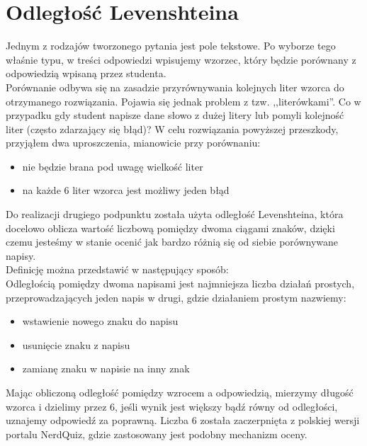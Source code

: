 \documentclass[a4paper,12pt]{article}
\begin{document}
\section{Odległość Levenshteina}
Jednym z rodzajów tworzonego pytania jest pole tekstowe. Po wyborze tego właśnie typu, w
treści odpowiedzi wpisujemy wzorzec, który będzie porównany z odpowiedzią wpisaną przez
studenta.\\
Porównanie odbywa się na zasadzie przyrównywania kolejnych liter wzorca do otrzymanego
rozwiązania. Pojawia się jednak problem z tzw. ,,literówkami''. Co w przypadku gdy student
napisze dane słowo z dużej litery lub pomyli kolejność liter (często zdarzający się błąd)?
W celu rozwiązania powyższej przeszkody, przyjąłem dwa uproszczenia, mianowicie przy
porównaniu:
\begin{itemize}
  \item nie będzie brana pod uwagę wielkość liter
  \item na każde 6 liter wzorca jest możliwy jeden błąd
\end{itemize}
Do realizacji drugiego podpunktu została użyta odległość Levenshteina, która docelowo
oblicza wartość liczbową pomiędzy dwoma ciągami znaków, dzięki czemu jesteśmy w stanie
ocenić jak bardzo różnią się od siebie porównywane napisy.\\
Definicję można przedstawić w następujący sposób: \cite{levenshtein}\\
Odległością pomiędzy dwoma napisami jest najmniejsza liczba działań prostych,
przeprowadzających jeden napis w drugi, gdzie działaniem prostym nazwiemy:
\begin{itemize}
  \item wstawienie nowego znaku do napisu
  \item usunięcie znaku z napisu
  \item zamianę znaku w napisie na inny znak
\end{itemize}
Mając obliczoną odległość pomiędzy wzrocem a odpowiedzią, mierzymy długość wzorca i
dzielimy przez 6, jeśli wynik jest większy bądź równy od odległości, uznajemy odpowiedź
za poprawną. Liczba 6 została zaczerpnięta z polskiej wersji portalu NerdQuiz, gdzie
zastosowany jest podobny mechanizm oceny.

\clearpage
\tableofcontents
\clearpage


\end{document}

